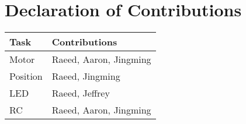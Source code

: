 \section*{Declaration of Contributions}
\begin{table}[htp]
\centering
\begin{tabular}{|l|l|}
\hline
    Task        & Contributions             \\ \hline
    Motor       & Raeed, Aaron, Jingming    \\ \hline
    Position    & Raeed, Jingming           \\ \hline
    LED         & Raeed, Jeffrey            \\ \hline
    RC          & Raeed, Aaron, Jingming    \\ \hline
\end{tabular}
\end{table}